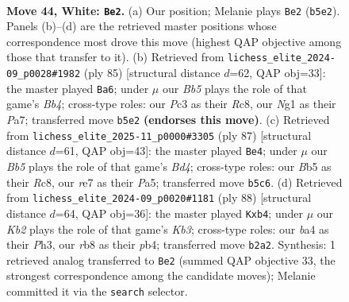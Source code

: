 \documentclass[11pt]{article}
\begin{document}
\clearpage

\begin{figure}[p]\centering
\begin{subfigure}{0.46\textwidth}\centering
\resizebox{\linewidth}{!}{%
\newchessgame
\chessboard[
  setfen={1r6/4r3/1p5k/pBp1n3/b5p1/2P3P1/1K1N3P/4R1NR w - - 0 44},
  showmover=false,
  pgfstyle=straightmove, color=movearrow, markmove={b5-e2}
]}
\caption{}
\end{subfigure}\hfill
\begin{subfigure}{0.46\textwidth}\centering
\resizebox{\linewidth}{!}{%
\newchessgame
\chessboard[
  setfen={2r5/p3r1k1/1p4p1/1bnB3p/1R2P2P/P3K1N1/3R2P1/8 b - - 24 43},
  showmover=false,
  pgfstyle=straightmove, color=movearrow, markmove={b5-a6}
]}
\caption{}
\end{subfigure}
\\[4pt]
\begin{subfigure}{0.46\textwidth}\centering
\resizebox{\linewidth}{!}{%
\newchessgame
\chessboard[
  setfen={2r2k2/5np1/1P5p/p2bPp2/1pB2P2/1R4PP/1N6/4K3 b - - 1 44},
  showmover=false,
  pgfstyle=straightmove, color=movearrow, markmove={d5-e4}
]}
\caption{}
\end{subfigure}\hfill
\begin{subfigure}{0.46\textwidth}\centering
\resizebox{\linewidth}{!}{%
\newchessgame
\chessboard[
  setfen={2b1k3/5pb1/1B2n1p1/3r4/Pp5p/1K3P1P/1N2R1P1/8 w - - 1 45},
  showmover=false,
  pgfstyle=straightmove, color=movearrow, markmove={b3-b4}
]}
\caption{}
\end{subfigure}
\caption{\textbf{Move 44, White: \texttt{Be2}.} (a) Our position; Melanie plays \texttt{Be2} (\texttt{b5e2}). Panels (b)--(d) are the retrieved master positions whose correspondence most drove this move (highest QAP objective among those that transfer to it). (b) Retrieved from \texttt{lichess\_elite\_2024-09\_p0028\#1982} (ply 85) [structural distance $d$=62, QAP obj=33]: the master played \texttt{Ba6}; under $\mu$ our \emph{Bb5} plays the role of that game's \emph{Bb4}; cross-type roles: our \emph{P}c3 as their \emph{R}c8, our \emph{N}g1 as their \emph{P}a7; transferred move \texttt{b5e2} \textbf{(endorses this move)}. (c) Retrieved from \texttt{lichess\_elite\_2025-11\_p0000\#3305} (ply 87) [structural distance $d$=61, QAP obj=43]: the master played \texttt{Be4}; under $\mu$ our \emph{Bb5} plays the role of that game's \emph{Bd4}; cross-type roles: our \emph{B}b5 as their \emph{R}c8, our \emph{r}e7 as their \emph{P}a5; transferred move \texttt{b5c6}. (d) Retrieved from \texttt{lichess\_elite\_2024-09\_p0020\#1181} (ply 88) [structural distance $d$=64, QAP obj=36]: the master played \texttt{Kxb4}; under $\mu$ our \emph{Kb2} plays the role of that game's \emph{Kb3}; cross-type roles: our \emph{b}a4 as their \emph{P}h3, our \emph{r}b8 as their \emph{p}b4; transferred move \texttt{b2a2}. Synthesis: 1 retrieved analog transferred to \texttt{Be2} (summed QAP objective 33, the strongest correspondence among the candidate moves); Melanie committed it via the \texttt{search} selector.}
\label{fig:thought-m86}
\end{figure}
\end{document}
